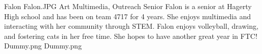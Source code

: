 \insertbio
{Falon}
{Falon.JPG}
{Art}
{Multimedia, Outreach}
{Senior}
{
Falon is a senior at Hagerty High school and has been on team 4717 for 4 years. She enjoys multimedia and interacting with her community through STEM. Falon enjoys volleyball, drawing, and fostering cats in her free time. She hopes to have another great year in FTC!
}
{Dummy.png}
{Dummy.png}
